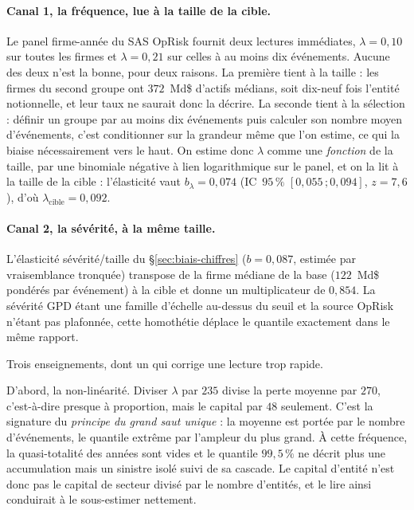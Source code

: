 \paragraph{Canal 1, la fréquence, lue à la taille de la cible.} Le panel firme-année du SAS
OpRisk fournit deux lectures immédiates, $\lambda = 0{,}10$ sur toutes les firmes et
$\lambda = 0{,}21$ sur celles à au moins dix événements. Aucune des deux n'est la bonne, pour
deux raisons. La première tient à la taille : les firmes du second groupe ont
$372$~Md\$ d'actifs médians, soit dix-neuf fois l'entité notionnelle, et leur taux ne
saurait donc la décrire. La seconde tient à la sélection : définir un groupe par
\og{}au moins dix événements\fg{} puis calculer son nombre moyen d'événements, c'est
conditionner sur la grandeur même que l'on estime, ce qui la biaise nécessairement vers le
haut. On estime donc $\lambda$ comme une \emph{fonction} de la taille, par une binomiale
négative à lien logarithmique sur le panel, et on la lit à la taille de la cible :
l'élasticité vaut $b_\lambda = 0{,}074$ (IC~$95\,\%$ $[0{,}055\,;0{,}094]$, $z = 7{,}6$), d'où
$\lambda_{\text{cible}} = 0{,}092$.

\paragraph{Canal 2, la sévérité, à la même taille.} L'élasticité sévérité/taille du
\S\ref{sec:biais-chiffres} ($b = 0{,}087$, estimée par vraisemblance tronquée) transpose de la
firme médiane de la base ($122$~Md\$ pondérés par événement) à la cible et donne un
multiplicateur de $0{,}854$. La sévérité GPD étant une famille d'échelle au-dessus du seuil et
la source OpRisk n'étant pas plafonnée, cette homothétie déplace le quantile exactement dans
le même rapport.

Trois enseignements, dont un qui corrige une lecture trop rapide.

D'abord, la non-linéarité. Diviser $\lambda$ par $235$ divise la perte moyenne par $270$,
c'est-à-dire presque à proportion, mais le capital par $48$ seulement. C'est la signature du
\emph{principe du grand saut unique} : la moyenne est portée par le nombre d'événements, le
quantile extrême par l'ampleur du plus grand. À cette fréquence, la quasi-totalité des années
sont vides et le quantile $99{,}5\,\%$ ne décrit plus une accumulation mais un sinistre isolé
suivi de sa cascade. Le capital d'entité n'est donc pas le capital de secteur divisé
par le nombre d'entités, et le lire ainsi conduirait à le sous-estimer nettement.

